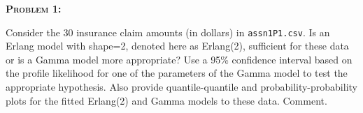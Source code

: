 \documentclass[12pt,oneside]{article}
\newenvironment{problem}[1]
{\begin{mdframed}
        \textbf{\textsc{Problem #1:}}
}
    {\end{mdframed}}
\begin{document}




\begin{problem}{1}
Consider the 30 insurance claim amounts (in dollars) in \texttt{assn1P1.csv}. Is an Erlang model with shape=2, denoted here as Erlang(2), sufficient for these data or is a Gamma model more appropriate? Use a 95\% confidence interval based on the profile likelihood for one of the parameters of the Gamma model to test the appropriate hypothesis. Also provide quantile-quantile and probability-probability plots for the fitted Erlang(2) and Gamma models to these data. Comment.
\end{problem}
\end{document}
